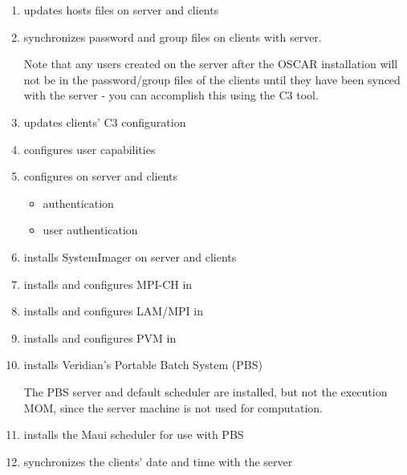 \begin{enumerate}
\item updates hosts files on server and clients
  
\item synchronizes password and group files on clients with server.
  
  Note that any users created on the server after the OSCAR
  installation will not be in the password/group files of the clients
  until they have been synced with the server - you can accomplish
  this using the C3  tool.

\item updates clients' C3 configuration

\item configures user  capabilities

\item configures  on server and clients

  \begin{itemize}
  \item {} authentication
  \item user authentication
  \end{itemize}

\item installs SystemImager on server and clients
  
\item installs and configures MPI-CH in 

\item installs and configures LAM/MPI in 

\item installs and configures PVM in 

\item installs Veridian's Portable Batch System (PBS)
  
  The PBS server and default scheduler are installed, but not the
  execution MOM, since the server machine is not used for computation.

\item installs the Maui scheduler for use with PBS

\item synchronizes the clients' date and time with the server
\end{enumerate}


